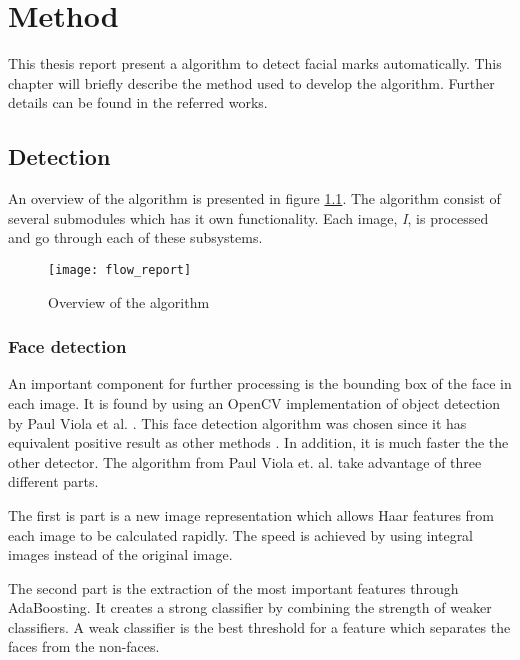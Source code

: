 \chapter{Method}\label{cha:method}

This thesis report present a algorithm to detect facial marks automatically. This chapter will briefly describe the method used to develop the algorithm. Further details can be found in the referred works. 

\section{Detection}

An overview of the algorithm is presented in figure \ref{fig:detection_flow}. The algorithm consist of several submodules which has it own functionality. Each image, \textit{I}, is processed and go through each of these subsystems. 

\begin{figure}[h]
	\centering
	\texttt{[image: flow\_report]}
	\caption{Overview of the algorithm \label{fig:detection_flow}}
\end{figure}

\subsection{Face detection}

An important component for further processing is the bounding box of the face in each image. It is found by using an OpenCV \cite{opencv} implementation of object detection by Paul Viola et al. \cite{face_detection}. This face detection algorithm was chosen since it has equivalent positive result as other methods \cite{face_detecion_comp,face_detecion_comp_2}. In addition, it is much faster the the other detector. The algorithm from Paul Viola et. al. take advantage of three different parts. 

The first is part is a new image representation which allows Haar features from each image to be calculated rapidly. The speed is achieved by using integral images instead of the original image. 

The second part is the extraction of the most important features through AdaBoosting. It creates a strong classifier by combining the strength of weaker classifiers. A weak classifier is the best threshold for a feature which separates the faces from the non-faces.

